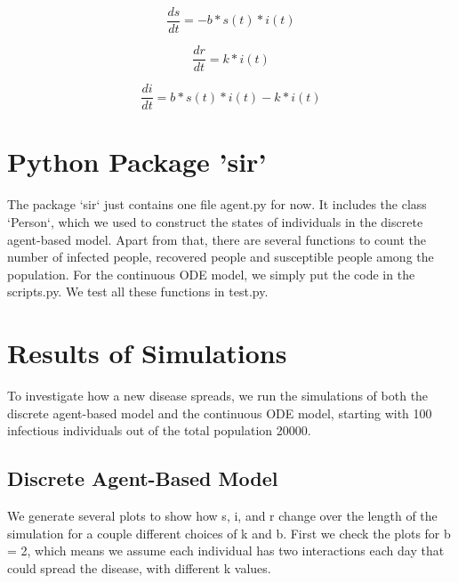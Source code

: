 \documentclass{article}
\begin{document}
$$\frac{ds}{dt} = -b * s(t) * i(t)$$

$$\frac{dr}{dt} = k * i(t)$$

$$\frac{di}{dt} = b * s(t) * i(t) - k * i(t)$$




\section{Python Package 'sir'}
The package `sir` just contains one file agent.py for now. It includes the class `Person`, which we used to construct the states of individuals in the discrete agent-based model. Apart from that, there are several functions to count the number of infected people, recovered people and susceptible people among the population. For the continuous ODE model, we simply put the code in the scripts.py. We test all these functions in test.py. 










\section{Results of Simulations}

To investigate how a new disease spreads, we run the simulations of both the discrete agent-based model and the continuous ODE model, starting with 100 infectious individuals out of the total population 20000.




\subsection{Discrete Agent-Based Model}

We generate several plots to show how s, i, and r change over the length of the simulation for a couple different choices of k and b. First we check the plots for b = 2, which means we assume each individual has two interactions each day that could spread the disease, with different k values.
\end{document}
